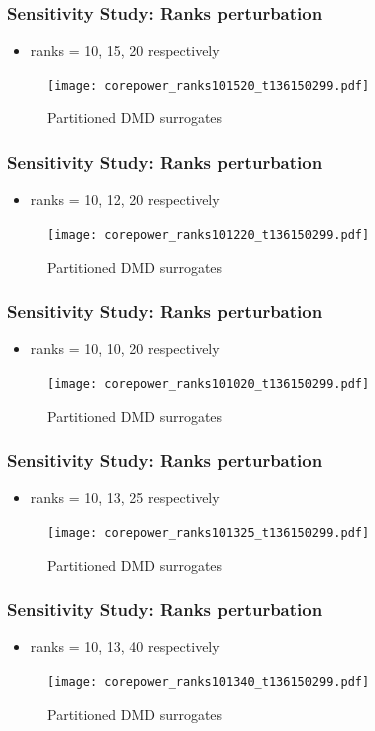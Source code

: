 \documentclass[fleqn]{beamer}
\begin{document}
\begin{frame}
\frametitle{Sensitivity Study: Ranks perturbation}
\begin{itemize}
 \item ranks = 10, 15, 20 respectively
\end{itemize}
\begin{figure}[ht]
\texttt{[image: corepower\_ranks101520\_t136150299.pdf]}
\caption{Partitioned DMD surrogates}
\end{figure}
\end{frame}

\begin{frame}
\frametitle{Sensitivity Study: Ranks perturbation}
\begin{itemize}
 \item ranks = 10, 12, 20 respectively
\end{itemize}
\begin{figure}[ht]
\texttt{[image: corepower\_ranks101220\_t136150299.pdf]}
\caption{Partitioned DMD surrogates}
\end{figure}
\end{frame}

\begin{frame}
\frametitle{Sensitivity Study: Ranks perturbation}
\begin{itemize}
 \item ranks = 10, 10, 20 respectively
\end{itemize}
\begin{figure}[ht]
\texttt{[image: corepower\_ranks101020\_t136150299.pdf]}
\caption{Partitioned DMD surrogates}
\end{figure}
\end{frame}

\begin{frame}
\frametitle{Sensitivity Study: Ranks perturbation}
\begin{itemize}
 \item ranks = 10, 13, 25 respectively
\end{itemize}
\begin{figure}[ht]
\texttt{[image: corepower\_ranks101325\_t136150299.pdf]}
\caption{Partitioned DMD surrogates}
\end{figure}
\end{frame}

\begin{frame}
\frametitle{Sensitivity Study: Ranks perturbation}
\begin{itemize}
 \item ranks = 10, 13, 40 respectively
\end{itemize}
\begin{figure}[ht]
\texttt{[image: corepower\_ranks101340\_t136150299.pdf]}
\caption{Partitioned DMD surrogates}
\end{figure}
\end{frame}
\end{document}
